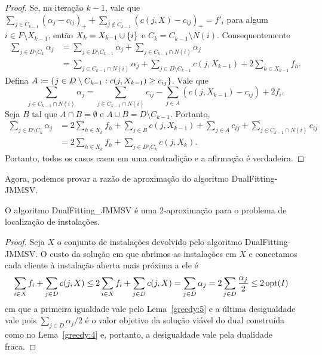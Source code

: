 \begin{proof}
Se, na iteração $k-1$, vale que $\sum_{j \in C_{k-1}} (\alpha_j - c_{ij})_+ + \sum_{j \not \in C_{k-1}}(c(j,X) - c_{ij})_+ = f'_i$ para algum $i \in F \setminus X_{k-1}$, então $X_k = X_{k-1} \cup \{i\}$ e $C_k = C_{k-1} \setminus N(i)$. Consequentemente 
\begin{align*}
\sum_{j \in D \setminus C_k} \alpha_j &= \sum_{j \in D\setminus C_{k-1}} \alpha_j + \sum_{j \in C_{k-1}\cap N(i)} \alpha_j \\
&= \sum_{j \in C_{k-1}\cap N(i)} \alpha_j +  \sum_{j \in D\setminus C_{k-1}}c(j,X_{k-1}) + 2 \sum_{h \in X_{k-1}} f_h.
\end{align*}
Defina $A\coloneqq \{j \in D\setminus C_{k-1}: c(j,X_{k-1}) \geq c_{ij}\}$. Vale que
\[ \sum_{j \in C_{k-1}\cap N(i)} \alpha_j = \sum_{j \in C_{k-1}\cap N(i)} c_{ij} - \sum_{j \in A} (c(j,X_{k-1}) - c_{ij}) + 2f_i. \]
Seja $B$ tal que $A \cap B = \emptyset$ e $A \cup B = D\setminus C_{k-1}$. Portanto,
\begin{subequations}
\begin{align*}
\sum_{j \in D \setminus C_k} \alpha_j &= 2\sum_{h \in X_k} f_h + \sum_{j \in B} c(j,X_{k-1}) + \sum_{j \in A} c_{ij} + \sum_{j \in C_{k-1} \cap N(i)} c_{ij}\\
&= 2 \sum_{h \in X_k} f_h + \sum_{j \in D \setminus C_k} c(j,X_k). 
\end{align*}
\end{subequations}
Portanto, todos os casos caem em uma contradição e a afirmação é verdadeira.
\end{proof}

Agora, podemos provar a razão de aproximação do algoritmo {\sc DualFitting-JMMSV}.

\begin{theorem}
O algoritmo {\sc DualFitting\_JMMSV} é uma 2-aproximação para o problema de localização de instalações.
\end{theorem} 
\begin{proof}
Seja $X$ o conjunto de instalações devolvido pelo algoritmo {\sc DualFitting-JMMSV}. O custo da solução em que abrimos as instalações em $X$ e conectamos cada cliente à instalação aberta mais próxima a ele é
\begin{subequations}
\begin{align*}
\sum_{i \in X} f_i + \sum_{j \in D}c(j,X) &\leq 2\sum_{i \in X} f_i + \sum_{j \in D}c(j,X) = \sum_{j \in D} \alpha_j = 2\sum_{j \in D} \frac{\alpha_j}{2} \leq 2\, \mathrm{opt}(I)  
\end{align*}
\end{subequations}
em que a primeira igualdade vale pelo Lema~\ref{greedy:5} e a última desigualdade vale pois $\sum_{j \in D} \alpha_j/2 $ é o valor objetivo da solução viável do dual construída como no Lema~\ref{greedy:4} e, portanto, a desigualdade vale pela dualidade fraca.
\end{proof}

